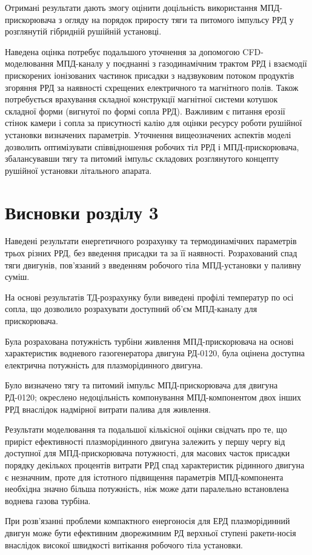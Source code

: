 Отримані результати дають змогу оцінити доцільність використання МПД-прискорювача з огляду на порядок приросту тяги та питомого імпульсу РРД у розглянутій гібридній рушійній установці.

Наведена оцінка потребує подальшого уточнення за допомогою CFD-моделювання МПД-каналу у поєднанні з газодинамічним трактом РРД і взаємодії прискорених іонізованих частинок присадки з надзвуковим потоком продуктів згоряння РРД за наявності схрещених електричного та магнітного полів. Також потребується врахування складної конструкції магнітної системи котушок складної форми (вигнутої по формі сопла РРД). Важливим є питання ерозії стінок камери і сопла за присутності калію для оцінки ресурсу роботи рушійної установки визначених параметрів. Уточнення вищеозначених аспектів моделі дозволить оптимізувати співвідношення робочих тіл РРД і МПД-прискорювача, збалансувавши тягу та питомий імпульс складових розглянутого концепту рушійної установки літального апарата.


\section{Висновки розділу 3}


Наведені результати енергетичного розрахунку та термодинамічних параметрів трьох різних РРД, без введення присадки та за її наявності. Розрахований спад тяги двигунів, пов'язаний з введенням робочого тіла МПД-установки у паливну суміш.

На основі результатів ТД-розрахунку були виведені профілі температур по осі сопла, що дозволило розрахувати доступний об'єм МПД-каналу для прискорювача.

Була розрахована потужність турбіни живлення МПД-прискорювача на основі характеристик водневого газогенератора двигуна РД-0120, була оцінена доступна електрична потужність для плазморідинного двигуна.

Було визначено тягу та питомий імпульс МПД-прискорювача для двигуна РД-0120; окреслено недоцільність компонування МПД-компонентом двох інших РРД внаслідок надмірної витрати палива для живлення.

Результати моделювання та подальшої кількісної оцінки свідчать про те, що приріст ефективності плазморідинного двигуна залежить у першу чергу від доступної для МПД-прискорювача потужності, для масових часток присадки порядку декількох процентів витрати РРД спад характеристик рідинного двигуна є незначним, проте для істотного підвищення параметрів МПД-компонента необхідна значно більша потужність, ніж може дати паралельно встановлена воднева газова турбіна.

При розв'язанні проблеми компактного енергоносія для ЕРД плазморідинний двигун може бути ефективним дворежимним РД верхньої ступені ракети-носія внаслідок високої швидкості витікання робочого тіла установки.